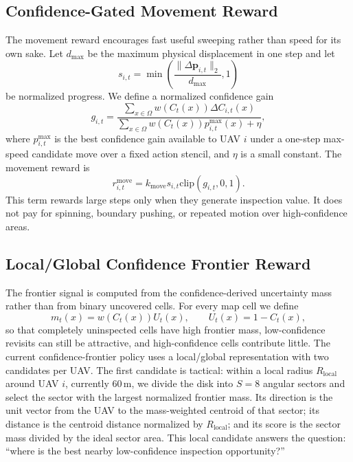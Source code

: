 \documentclass{article}
\newcommand{\conf}{C}
\newcommand{\unc}{U}
\newcommand{\grid}{\Omega}
\newcommand{\move}{\Delta \mathbf{p}}
\begin{document}
\subsection{Confidence-Gated Movement Reward}

The movement reward encourages fast useful sweeping rather than speed for its
own sake. Let \(d_{\max}\) be the maximum physical displacement in one step and
let
\begin{equation}
    s_{i,t} =
    \min \left( \frac{\|\move_{i,t}\|_2}{d_{\max}}, 1 \right)
\end{equation}
be normalized progress. We define a normalized confidence gain
\begin{equation}
    g_{i,t}
    =
    \frac{
        \sum_{x \in \grid} w(\conf_t(x)) \Delta \conf_{i,t}(x)
    }{
        \sum_{x \in \grid} w(\conf_t(x)) p^{\max}_{i,t}(x) + \eta
    },
    \label{eq:normalized_conf_gain}
\end{equation}
where \(p^{\max}_{i,t}\) is the best confidence gain available to UAV \(i\) under
a one-step max-speed candidate move over a fixed action stencil, and \(\eta\) is
a small constant. The movement reward is
\begin{equation}
    r^{\mathrm{move}}_{i,t}
    =
    k_{\mathrm{move}} s_{i,t} \mathrm{clip}(g_{i,t}, 0, 1).
    \label{eq:move_reward}
\end{equation}
This term rewards large steps only when they generate inspection value. It does
not pay for spinning, boundary pushing, or repeated motion over high-confidence
areas.

\subsection{Local/Global Confidence Frontier Reward}

The frontier signal is computed from the confidence-derived uncertainty mass
rather than from binary uncovered cells. For every map cell we define
\begin{equation}
    m_t(x)
    =
    w(\conf_t(x)) \unc_t(x),
    \qquad
    \unc_t(x)=1-\conf_t(x),
    \label{eq:frontier_mass}
\end{equation}
so that completely uninspected cells have high frontier mass, low-confidence
revisits can still be attractive, and high-confidence cells contribute little.
The current confidence-frontier policy uses a local/global representation with
two candidates per UAV. The first candidate is tactical: within a local radius
\(R_{\mathrm{local}}\) around UAV \(i\), currently \(60\,\mathrm{m}\), we divide
the disk into \(S=8\) angular sectors and select the sector with the largest
normalized frontier mass. Its direction is the unit vector from the UAV to the
mass-weighted centroid of that sector; its distance is the centroid distance
normalized by \(R_{\mathrm{local}}\); and its score is the sector mass divided by
the ideal sector area. This local candidate answers the question: ``where is the
best nearby low-confidence inspection opportunity?''
\end{document}
